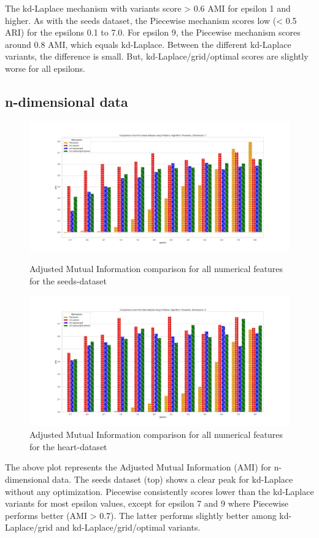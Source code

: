 The kd-Laplace mechanism with variants score > 0.6 AMI for epsilon 1 and higher.
As with the seeds dataset, the Piecewise mechanism scores low (< 0.5 ARI) for the epsilons 0.1 to 7.0.
For epsilon 9, the Piecewise mechanism scores around 0.8 AMI, which equals kd-Laplace.
Between the different kd-Laplace variants, the difference is small. But, kd-Laplace/grid/optimal scores are slightly worse for all epsilons.

\newpage
\subsection{n-dimensional data}
\begin{figure}[H]
    \centering
    \begin{minipage}[c]{0.8\textwidth}
        \includegraphics[width=1\textwidth]{Results/RQ2-nd/seeds-dataset/ami_seeds-dataset_comparison.png}
        \caption{Adjusted Mutual Information comparison for all numerical features for the seeds-dataset}
        \label{fig:ami_seeds-dataset_comparison_nd}
    \end{minipage}
    \begin{minipage}[c]{0.8\textwidth}
        \includegraphics[width=1\textwidth]{Results/RQ2-nd/heart-dataset/ami_heart-dataset_comparison.png}
        \caption{Adjusted Mutual Information comparison for all numerical features for the heart-dataset}
        \label{fig:ami_heart-dataset_comparison_nd}
    \end{minipage}
\end{figure}
The above plot represents the Adjusted Mutual Information (AMI) for n-dimensional data. The seeds dataset (top) shows a clear peak for kd-Laplace without any optimization. Piecewise consistently scores lower than the kd-Laplace variants for most epsilon values, except for epsilon 7 and 9 where Piecewise performs better (AMI > 0.7). The latter performs slightly better among kd-Laplace/grid and kd-Laplace/grid/optimal variants.

